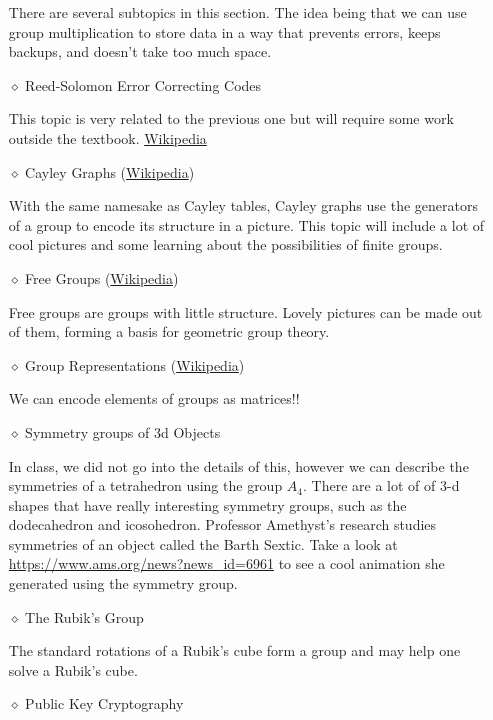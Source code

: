 \documentclass[12pt]{article}
\begin{document}
\begin{itemize}
				There are several subtopics in this section. The idea being that we can use group multiplication to store data in a way that prevents errors, keeps backups, and doesn't take too much space.  
		\item[$\diamond$] Reed-Solomon Error Correcting Codes
		
			This topic is very related to the previous one but will require some work outside the textbook.  \href{https://en.wikipedia.org/wiki/Reed%E2%80%93Solomon_error_corrections}{Wikipedia}
		\item[$\diamond$] Cayley Graphs (\href{https://en.wikipedia.org/wiki/Cayley_graph}{Wikipedia})
			
			With the same namesake as Cayley tables, Cayley graphs use the generators of a group to encode its structure in a picture. This topic will include a lot of cool pictures and some learning about the possibilities of finite groups.
			
		\item[$\diamond$] Free Groups (\href{https://en.wikipedia.org/wiki/Free_group}{Wikipedia})

			Free groups are groups with little structure. Lovely pictures can be made out of them, forming a basis for geometric group theory.	
				
		\item[$\diamond$] Group Representations (\href{https://en.wikipedia.org/wiki/Group_representation}{Wikipedia})

			We can encode elements of groups as matrices!!
			
		\item[$\diamond$] Symmetry groups of 3d Objects
		
			In class, we did not go into the details of this, however we can describe the symmetries of a tetrahedron using the group $A_4$. There are a lot of of 3-d shapes that have really interesting symmetry groups, such as the dodecahedron and icosohedron. Professor Amethyst's research studies symmetries of an object called the Barth Sextic. Take a look at \url{https://www.ams.org/news?news_id=6961} to see a cool animation she generated using the symmetry group.
		
		\item[$\diamond$] The Rubik's Group
		
			The standard rotations of a Rubik's cube form a group and may help one solve a Rubik's cube.
		
		\item[$\diamond$] Public Key Cryptography
		

\end{itemize}
\end{document}
